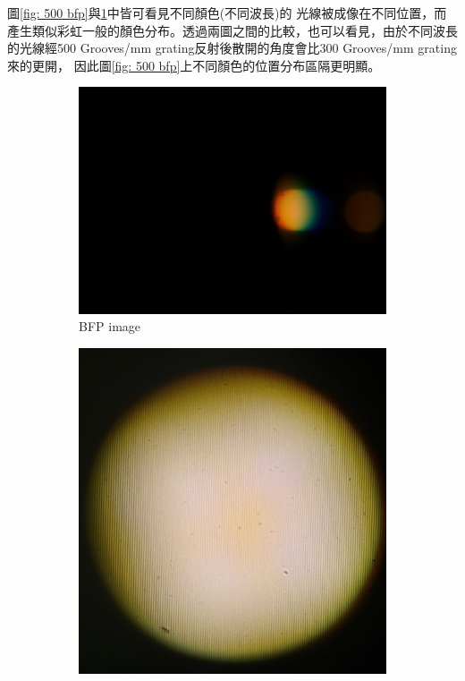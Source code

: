 \documentclass[12pt]{article}
\begin{document}
圖\ref{fig: 500 bfp}與\ref{fig: 300 bfp}中皆可看見不同顏色(不同波長)的
光線被成像在不同位置，而產生類似彩虹一般的顏色分布。透過兩圖之間的比較，也可以看見，由於不同波長的光線經500 Grooves/mm grating反射後散開的角度會比300 Grooves/mm grating來的更開，
因此圖\ref{fig: 500 bfp}上不同顏色的位置分布區隔更明顯。

\begin{figure}[h]
    \centering
    \begin{subfigure}[b]{0.45\textwidth}
        \centering
        \includegraphics[width = \linewidth]{300bfp.jpeg}
        \caption{BFP image}
        \label{fig: 300 bfp}
    \end{subfigure}
    \begin{subfigure}[b]{0.45\textwidth}
        \centering
        \includegraphics[width = \linewidth]{300real.jpeg}

\end{subfigure}
\end{figure}
\end{document}
